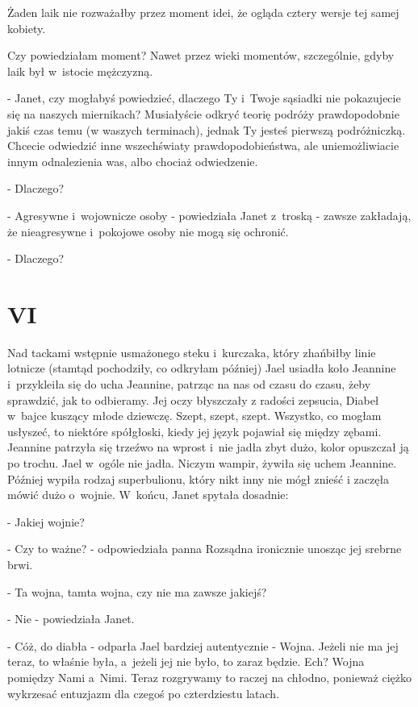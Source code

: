 \documentclass[oneside,polish,12pt,sfheadings]{mwbk}
\begin{document}
Żaden laik nie rozważałby przez moment idei, że ogląda cztery wersje
tej samej kobiety.

Czy powiedziałam moment? Nawet przez wieki momentów, szczególnie,
gdyby laik był w~istocie mężczyzną.

- Janet, czy mogłabyś powiedzieć, dlaczego Ty i~Twoje sąsiadki nie
pokazujecie się na naszych miernikach? Musiałyście odkryć teorię podróży
prawdopodobnie jakiś czas temu (w waszych terminach), jednak Ty jesteś
pierwszą podróżniczką. Chcecie odwiedzić inne wszechświaty prawdopodobieństwa,
ale uniemożliwiacie innym odnalezienia was, albo chociaż odwiedzenie.

- Dlaczego?

- Agresywne i~wojownicze osoby - powiedziała Janet z~troską - zawsze
zakładają, że nieagresywne i~pokojowe osoby nie mogą się ochronić.

- Dlaczego?

\chapter{VI}

Nad tackami wstępnie usmażonego steku i~kurczaka, który zhańbiłby
linie lotnicze (stamtąd pochodziły, co odkryłam później) Jael usiadła
koło Jeannine i~przykleiła się do ucha Jeannine, patrząc na nas od
czasu do czasu, żeby sprawdzić, jak to odbieramy. Jej oczy błyszczały
z radości zepsucia, Diabeł w~bajce kuszący młode dziewczę. Szept,
szept, szept. Wszystko, co mogłam usłyszeć, to niektóre spółgłoski,
kiedy jej język pojawiał się między zębami. Jeannine patrzyła się
trzeźwo na wprost i~nie jadła zbyt dużo, kolor opuszczał ją po trochu.
Jael w~ogóle nie jadła. Niczym wampir, żywiła się uchem Jeannine.
Później wypiła rodzaj superbulionu, który nikt inny nie mógł znieść
i zaczęła mówić dużo o~wojnie. W~końcu, Janet spytała dosadnie: 

- Jakiej wojnie?

- Czy to ważne? - odpowiedziała panna Rozsądna ironicznie unosząc
jej srebrne brwi.

- Ta wojna, tamta wojna, czy nie ma zawsze jakiejś?

- Nie - powiedziała Janet.

- Cóż, do diabła - odparła Jael bardziej autentycznie - Wojna. Jeżeli
nie ma jej teraz, to właśnie była, a~jeżeli jej nie było, to zaraz
będzie. Ech? Wojna pomiędzy Nami a~Nimi. Teraz rozgrywamy to raczej
na chłodno, ponieważ ciężko wykrzesać entuzjazm dla czegoś po czterdziestu
latach.
\end{document}

